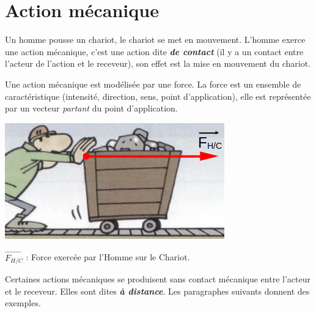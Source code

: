 \section{Action mécanique}
%
Un homme pousse un chariot, le chariot se met en mouvement. L'homme exerce une action mécanique,
c'est une action dite \textbf{\textit {de contact}} (il y a un contact entre l'acteur de l'action et le receveur), son effet est la mise en mouvement du chariot.

Une action mécanique est modélisée par une force. La force est un ensemble de caractéristique (intensité, direction, sens, point d'application), elle est représentée par un vecteur {\it partant} du point d'application.

\begin{center}
\includegraphics[scale=0.6]{./forces/chariotPousseForce}

\vspace{0.1cm}
$\overrightarrow{F_{H/C}}$ : Force exercée par l'Homme sur le Chariot.
\end{center}

Certaines actions mécaniques se produisent sans contact mécanique entre l'acteur et le receveur. Elles sont dites \textbf{\textit {à distance}}. Les paragraphes suivants donnent des exemples.

